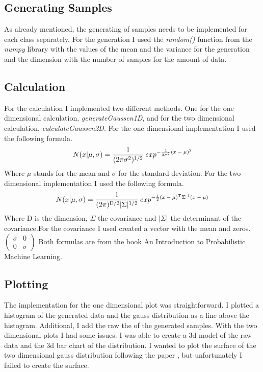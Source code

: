 \documentclass[10pt, a4paper, twocolumn]{article} %
\begin{document}
\subsection{Generating Samples}
As already mentioned, the generating of samples needs to be implemented for each class separately. For the generation I used the \textit{random()} function from the \textit{numpy} library with the values of the mean and the variance for the generation and the dimension with the number of samples for the amount of data. 

\subsection{Calculation}
For the calculation I implemented two different methods. One for the one dimensional calculation, \textit{generateGaussen1D}, and for the two dimensional calculation, \textit{calculateGaussen2D}. For the one dimensional implementation I used the following formula. 
\[
N(x|\mu,\sigma) = \frac{1}{(2\pi\sigma\textsuperscript{2})\textsuperscript{1/2}}\:exp
\textsuperscript{$-\frac{1}{2\sigma\textsuperscript{2}}(x-\mu)\textsuperscript{2}$}
\]
Where $\mu$ stands for the mean and $\sigma$ for the standard deviation. For the two dimensional implementation I used the following formula. 
\[
N(x|\mu,\sigma) = \frac{1}{(2\pi)\textsuperscript{D/2} \vert\Sigma\vert\textsuperscript{1/2}}\:exp\textsuperscript{$-\frac{1}{2}(x-\mu)\textsuperscript{T}\Sigma\textsuperscript{-1}(x-\mu)$}
\]
Where D is the dimension, $\Sigma$ the covariance and $\vert\Sigma\vert$ the determinant of the covariance.For the covariance I used created a vector with the mean and zeros.
$\begin{pmatrix}
\sigma & 0\\
0 & \sigma
\end{pmatrix}$
Both formulas are from the book An Introduction to Probabilistic Machine Learning.  
\citep{bookMachineLearning}

\subsection{Plotting}
The implementation for the one dimensional plot was straightforward. I plotted a histogram of the generated data and the gauss distribution as a line above the histogram. Additional, I add the raw the of the generated samples. With the two dimensional plots I had some issues. I was able to create a 3d model of the raw data and the 3d bar chart of the distribution. I wanted to plot the surface of the two dimensional gauss distribution following the paper \citep{multiVariateNormalDistribution}, but unfortunately I failed to create the surface. 
\end{document}
